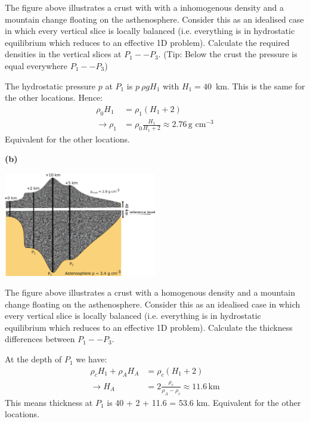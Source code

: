 \documentclass[a4paper,12pt]{article}
\newif\ifanswers
\begin{document}
The figure above illustrates a crust with  with a inhomogenous density and a mountain change floating on the asthenosphere. Consider this as an idealised case in which every vertical slice is locally balanced (i.e. everything is in hydrostatic equilibrium which reduces to an effective 1D problem). Calculate the required densities in the vertical slices at $P_1 -- P_3$. (Tip: Below the crust the pressure is equal everywhere $P_1 -- P_3$)


\ifanswers
  \begin{tcolorbox}[enhanced jigsaw,breakable,pad at break*=1mm,
    colback=blue!5!white,colframe=babyblueeyes,title=Solutions]
The hydrostatic pressure $p$ at $P_1$ is $p ~ \rho g H_1$ with $H_1=40$~km. This is the same for the other locations. Hence:
\begin{align*}
\rho_0 H_1 &= \rho_1 (H_1 + 2) \\
\rightarrow \rho_1 &= \rho_0 \frac{H_1}{H_1+2} \approx 2.76 \, \text{g cm}^{-3}
\end{align*}
Equivalent for the other locations.
\end{tcolorbox}

\textbf{(b)}

\begin{center}
\includegraphics[width=0.5\textwidth]{Figures/Gravimetry/Airy.png}
\end{center}

The figure above illustrates a crust with a homogenous density and a mountain change floating on the asthenosphere. Consider this as an idealised case in which every vertical slice is locally balanced (i.e. everything is in hydrostatic equilibrium which reduces to an effective 1D problem). Calculate the thickness differences between $P_1 -- P_3$.


\ifanswers
  \begin{tcolorbox}[enhanced jigsaw,breakable,pad at break*=1mm,
    colback=blue!5!white,colframe=babyblueeyes,title=Solutions]
At the depth of $P_1$ we have:
\begin{align*}
\rho_c H_1 + \rho_A H_A &= \rho_c (H_1 + 2) \\
\rightarrow H_A &= 2 \frac{\rho_c}{\rho_A -\rho_c} \approx 11.6 \, \text{km}
\end{align*}
This means thickness at $P_1$ is 40 + 2 + 11.6 = 53.6 km. Equivalent for the other locations.
\end{tcolorbox}
\end{document}
